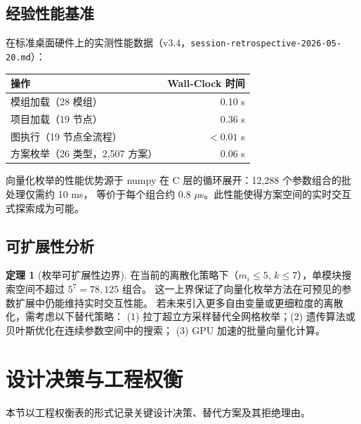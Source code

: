\documentclass[12pt,a4paper]{ctexart}
\theoremstyle{definition}
\newtheorem{theorem}{定理}[section]
\theoremstyle{remark}
\begin{document}
\subsection{经验性能基准}

在标准桌面硬件上的实测性能数据（v3.4，\texttt{session-retrospective-2026-05-20.md}）：

\begin{center}
\begin{tabular}{lr}
\toprule
\textbf{操作} & \textbf{Wall-Clock 时间} \\
\midrule
模组加载（28 模组）          & 0.10 s \\
项目加载（19 节点）          & 0.36 s \\
图执行（19 节点全流程）      & $< 0.01$ s \\
方案枚举（26 类型，2,507 方案）& 0.06 s \\
\bottomrule
\end{tabular}
\end{center}

向量化枚举的性能优势源于 numpy 在 C 层的循环展开：12,288 个参数组合的批处理仅需约 10 ms，
等价于每个组合约 0.8 $\mu$s。此性能使得方案空间的实时交互式探索成为可能。

\subsection{可扩展性分析}

\begin{theorem}[枚举可扩展性边界]
\label{thm:scalability}
在当前的离散化策略下（$m_i \le 5$, $k \le 7$），单模块搜索空间不超过 $5^7 = 78,125$ 组合。
这一上界保证了向量化枚举方法在可预见的参数扩展中仍能维持实时交互性能。
若未来引入更多自由变量或更细粒度的离散化，需考虑以下替代策略：
(1) 拉丁超立方采样替代全网格枚举；(2) 遗传算法或贝叶斯优化在连续参数空间中的搜索；
(3) GPU 加速的批量向量化计算。
\end{theorem}

\section{设计决策与工程权衡}\label{sec:tradeoffs}

本节以工程权衡表的形式记录关键设计决策、替代方案及其拒绝理由。
\end{document}

